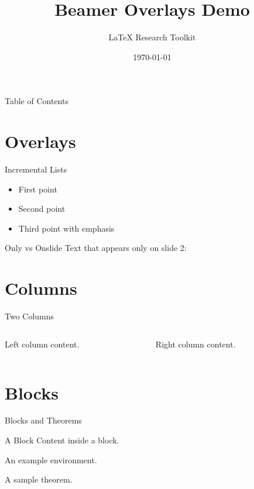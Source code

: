 \documentclass[aspectratio=169]{beamer}
\title{Beamer Overlays Demo}
\author{LaTeX Research Toolkit}
\date{\today}
\begin{document}
\begin{frame}
  \titlepage
\end{frame}

\begin{frame}{Table of Contents}
  \tableofcontents
\end{frame}

\section{Overlays}
\begin{frame}{Incremental Lists}
\begin{itemize}
  \item<1-> First point
  \item<2-> Second point
  \item<3-> Third point with \alert{emphasis}
\end{itemize}
\end{frame}

\begin{frame}{Only vs Onslide}
Text that appears only on slide 2:
\end{frame}

\section{Columns}
\begin{frame}{Two Columns}
\begin{columns}
  \begin{column}{0.48\textwidth}
    Left column content.
  \end{column}
  \begin{column}{0.48\textwidth}
    Right column content.
  \end{column}
\end{columns}
\end{frame}

\section{Blocks}
\begin{frame}{Blocks and Theorems}
\begin{block}{A Block}
Content inside a block.
\end{block}
\begin{example}
An example environment.
\end{example}
\begin{theorem}
A sample theorem.
\end{theorem}
\end{frame}
\end{document}
